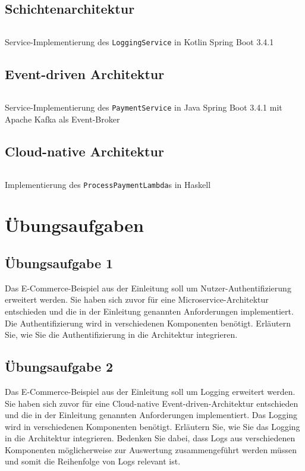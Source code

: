 \documentclass[acmtog]{acmart}
\begin{document}
\subsection{Schichtenarchitektur}
\label{app:code:layered:loggingservice}
\begin{listing}[H]
  \tiny
  \inputminted[linenos=true]{kotlin}{code/layered/LoggingServiceImpl.kt}
  \caption{Service-Implementierung des \texttt{LoggingService} in Kotlin Spring Boot 3.4.1}
\end{listing}

\subsection{Event-driven Architektur}
\label{app:code:eda:paymentservice}
\begin{listing}[H]
  \tiny
  \inputminted[linenos=true]{java}{code/eda/PaymentService.java}
  \caption{Service-Implementierung des \texttt{PaymentService} in Java Spring Boot 3.4.1 mit Apache Kafka als Event-Broker}
\end{listing}

\subsection{Cloud-native Architektur}
\label{app:code:cloudnative:paymentservice}
\begin{listing}[H]
  \tiny
  \inputminted[linenos=true]{haskell}{code/cloud/PaymentService.hs}
  \caption{Implementierung des \texttt{ProcessPaymentLambda}s in Haskell}
\end{listing}

\section{Übungsaufgaben}
\subsection{Übungsaufgabe 1}
Das E-Commerce-Beispiel aus der Einleitung soll um Nutzer-Authentifizierung erweitert werden.
Sie haben sich zuvor für eine Microservice-Architektur entschieden und die in der Einleitung genannten Anforderungen implementiert.
Die Authentifizierung wird in verschiedenen Komponenten benötigt.
Erläutern Sie, wie Sie die Authentifizierung in die Architektur integrieren.

\subsection{Übungsaufgabe 2}
Das E-Commerce-Beispiel aus der Einleitung soll um Logging erweitert werden.
Sie haben sich zuvor für eine Cloud-native Event-driven-Architektur entschieden und die in der Einleitung genannten Anforderungen implementiert.
Das Logging wird in verschiedenen Komponenten benötigt.
Erläutern Sie, wie Sie das Logging in die Architektur integrieren.
Bedenken Sie dabei, dass Logs aus verschiedenen Komponenten möglicherweise zur Auswertung zusammengeführt werden müssen und somit die Reihenfolge von Logs relevant ist.
\end{document}
